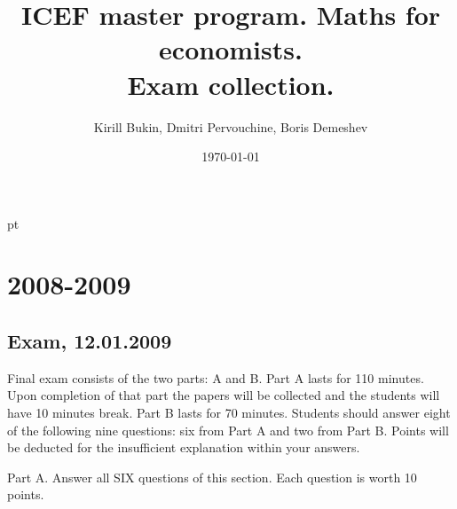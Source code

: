 \documentclass[12pt, a4paper]{article}
\title{ICEF master program. Maths for economists. \\Exam collection.}
\author{Kirill Bukin, Dmitri Pervouchine, Boris Demeshev}
\date{\today}
\begin{document}
 pt %

\maketitle
\tableofcontents

\section{2008-2009}



\subsection{Exam, 12.01.2009}

Final exam consists of the two parts: A and B. Part A lasts for 110 minutes.
Upon completion of that part the papers will be collected and the students will have 10 minutes break.
Part B lasts for 70 minutes.
Students should answer eight of the following nine questions: six from Part A  and two from Part B.
Points will be deducted for the insufficient explanation within your answers.

Part A.
Answer all SIX questions of this section. Each question is worth 10 points.
\end{document}
